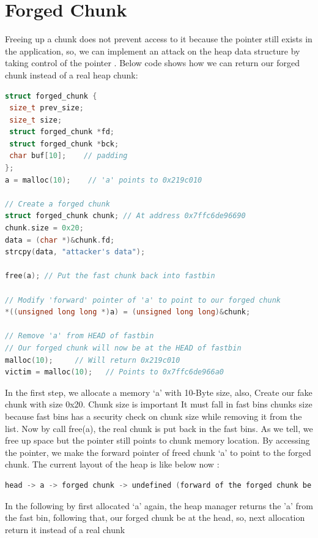 \documentclass{masterthesis}
\newcommand*\fb{fast bins}
\begin{document}
\section{Forged Chunk}
Freeing up a chunk does not prevent access to it because the pointer still exists in the application, so, we can implement an attack on the heap data structure by taking control of the pointer . Below code shows how we can return our forged chunk instead of a real heap chunk: 
\begin{lstlisting}[language=c,frame=tlrb]
struct forged_chunk {
 size_t prev_size;
 size_t size;
 struct forged_chunk *fd;
 struct forged_chunk *bck;
 char buf[10];    // padding
};
a = malloc(10);    // 'a' points to 0x219c010

// Create a forged chunk
struct forged_chunk chunk; // At address 0x7ffc6de96690
chunk.size = 0x20;
data = (char *)&chunk.fd;  
strcpy(data, "attacker's data");

free(a); // Put the fast chunk back into fastbin

// Modify 'forward' pointer of 'a' to point to our forged chunk
*((unsigned long long *)a) = (unsigned long long)&chunk;

// Remove 'a' from HEAD of fastbin
// Our forged chunk will now be at the HEAD of fastbin
malloc(10);     // Will return 0x219c010
victim = malloc(10);   // Points to 0x7ffc6de966a0
\end{lstlisting}

In the first step, we allocate a memory ‘a’ with 10-Byte size, also, Create our fake chunk with size 0x20. Chunk size is important It must fall in \fb{} chunks size because \fb{} has a security check on chunk size while removing it from the list.
Now by call free(a), the real chunk is put back in the \fb{}. As we tell, we free up space but the pointer still points to chunk memory location. By accessing the pointer, we make the forward pointer of freed chunk ‘a’ to point to the forged chunk. The current layout of the heap is like below now : 

\begin{lstlisting}[language=c,frame=tlrb]
head -> a -> forged chunk -> undefined (forward of the forged chunk be holding attacker's data)
\end{lstlisting}

In the following by first allocated ‘a’ again, the heap manager returns the 'a' from the fast bin, following that, our forged chunk be at the head, so, next allocation return it instead of a real chunk
\end{document}
